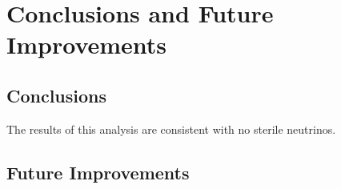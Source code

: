 \chapter{Conclusions and Future Improvements}
\label{conclusion}

\section{Conclusions}
The results of this analysis are consistent with no sterile neutrinos.

\section{Future Improvements}
